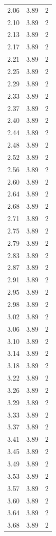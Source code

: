 \begin{longtable}{lrr}
  2.06 & 3.89 & 2 \\
  2.10 & 3.89 & 2 \\
  2.13 & 3.89 & 2 \\
  2.17 & 3.89 & 2 \\
  2.21 & 3.89 & 2 \\
  2.25 & 3.89 & 2 \\
  2.29 & 3.89 & 2 \\
  2.33 & 3.89 & 2 \\
  2.37 & 3.89 & 2 \\
  2.40 & 3.89 & 2 \\
  2.44 & 3.89 & 2 \\
  2.48 & 3.89 & 2 \\
  2.52 & 3.89 & 2 \\
  2.56 & 3.89 & 2 \\
  2.60 & 3.89 & 2 \\
  2.64 & 3.89 & 2 \\
  2.68 & 3.89 & 2 \\
  2.71 & 3.89 & 2 \\
  2.75 & 3.89 & 2 \\
  2.79 & 3.89 & 2 \\
  2.83 & 3.89 & 2 \\
  2.87 & 3.89 & 2 \\
  2.91 & 3.89 & 2 \\
  2.95 & 3.89 & 2 \\
  2.98 & 3.89 & 2 \\
  3.02 & 3.89 & 2 \\
  3.06 & 3.89 & 2 \\
  3.10 & 3.89 & 2 \\
  3.14 & 3.89 & 2 \\
  3.18 & 3.89 & 2 \\
  3.22 & 3.89 & 2 \\
  3.26 & 3.89 & 2 \\
  3.29 & 3.89 & 2 \\
  3.33 & 3.89 & 2 \\
  3.37 & 3.89 & 2 \\
  3.41 & 3.89 & 2 \\
  3.45 & 3.89 & 2 \\
  3.49 & 3.89 & 2 \\
  3.53 & 3.89 & 2 \\
  3.57 & 3.89 & 2 \\
  3.60 & 3.89 & 2 \\
  3.64 & 3.89 & 2 \\
  3.68 & 3.89 & 2 \\

\end{longtable}

